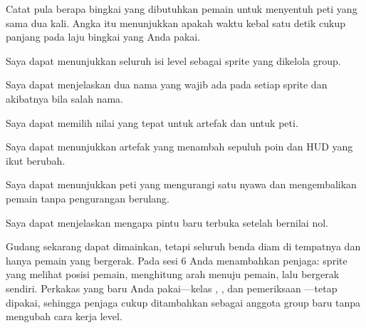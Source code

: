 Catat pula berapa bingkai yang dibutuhkan pemain untuk menyentuh peti yang
sama dua kali. Angka itu menunjukkan apakah waktu kebal satu detik cukup
panjang pada laju bingkai yang Anda pakai.


\begin{checklistbox}
\begin{checklist}
  \item Saya dapat menunjukkan seluruh isi level sebagai sprite yang dikelola
        group.
  \item Saya dapat menjelaskan dua nama yang wajib ada pada setiap sprite dan
        akibatnya bila salah nama.
  \item Saya dapat memilih nilai  yang tepat untuk artefak dan
        untuk peti.
  \item Saya dapat menunjukkan artefak yang menambah sepuluh poin dan HUD yang
        ikut berubah.
  \item Saya dapat menunjukkan peti yang mengurangi satu nyawa dan
        mengembalikan pemain tanpa pengurangan berulang.
  \item Saya dapat menjelaskan mengapa pintu baru terbuka setelah
         bernilai nol.
\end{checklist}
\end{checklistbox}


Gudang sekarang dapat dimainkan, tetapi seluruh benda diam di tempatnya dan
hanya pemain yang bergerak. Pada sesi 6 Anda menambahkan penjaga: sprite yang
melihat posisi pemain, menghitung arah menuju pemain, lalu bergerak sendiri.
Perkakas yang baru Anda pakai---kelas , , dan
pemeriksaan ---tetap dipakai, sehingga penjaga cukup ditambahkan
sebagai anggota group baru tanpa mengubah cara kerja level.
